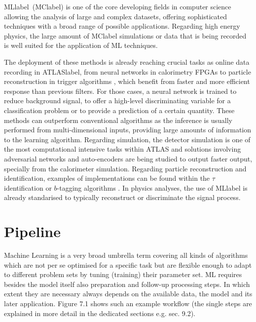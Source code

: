 \acrlong{MLlabel}~(\acrshort{MClabel}) is one of the core developing fields in computer science allowing the analysis of large and complex datasets, offering sophisticated techniques with a broad range of possible applications. Regarding high energy physics, the large amount of \acrshort{MClabel} simulations or data that is being recorded is well suited for the application of \acrshort{ML} techniques.

The deployment of these methods is already reaching crucial tasks as online data recording in \acrshort{ATLASlabel}, from neural networks in calorimetry FPGAs  %
to particle reconstruction in trigger algorithms %
, which benefit from faster and more efficient response than previous filters. For those cases, a neural network is trained to reduce background signal, to offer a high-level discriminating variable for a classification problem or to provide a prediction of a certain quantity. These methods can outperform conventional algorithms as the inference is usually performed from multi-dimensional inputs, providing large amounts of information to the learning algorithm. Regarding simulation, the detector simulation is one of the most computational intensive tasks within \acrshort{ATLAS} and solutions involving adversarial networks and auto-encoders are being studied to output faster output, specially from the calorimeter simulation. Regarding particle reconstruction and identification, examples of implementations can be found within the $\tau$ identification %
 or $b$-tagging algorithms %
 . In physics analyses, the use of \acrshort{MLlabel} is already standarised to typically reconstruct or discriminate the signal process.

\section{Pipeline}

Machine Learning is a very broad umbrella term covering all kinds of algorithms which are not per
se optimised for a specific task but are flexible enough to adapt to different problem sets by tuning
(training) their parameter set.
ML requires besides the model itself also preparation and follow-up processing steps. In which
extent they are necessary always depends on the available data, the model and its later application.
Figure 7.1 shows such an example workflow (the single steps are explained in more detail in the
dedicated sections e.g. sec. 9.2).


